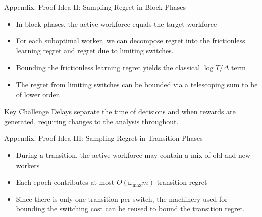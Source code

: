 \documentclass[10pt,aspectratio=169]{beamer}
\begin{document}
\begin{frame}[t]{Appendix: Proof Idea II: Sampling Regret in Block Phases}
\small
\begin{itemize}
    \item In block phases, the active workforce equals the target workforce
    \item For each suboptimal worker, we can decompose regret into the frictionless learning regret and regret due to limiting switches.
    \item Bounding the frictionless learning regret yields the classical \(\log T/\Delta\) term
    \item The regret from limiting switches can be bounded via a telescoping sum to be of lower order.
\end{itemize}

\begin{alertblock}{Key Challenge}
    Delays separate the time of decisions and when rewards are generated, requiring changes to the analysis throughout.
\end{alertblock}
\end{frame}

\begin{frame}[t]{Appendix: Proof Idea III: Sampling Regret in Transition Phases}
\begin{itemize}
    \item During a transition, the active workforce may contain a mix of old and new workers
    \item Each epoch contributes at most \(O(\omega_{\max}m)\) transition regret
    \item Since there is only one transition per switch, the machinery used for bounding the switching cost can be reused to bound the transition regret.
\end{itemize}
\end{frame}
\end{document}
